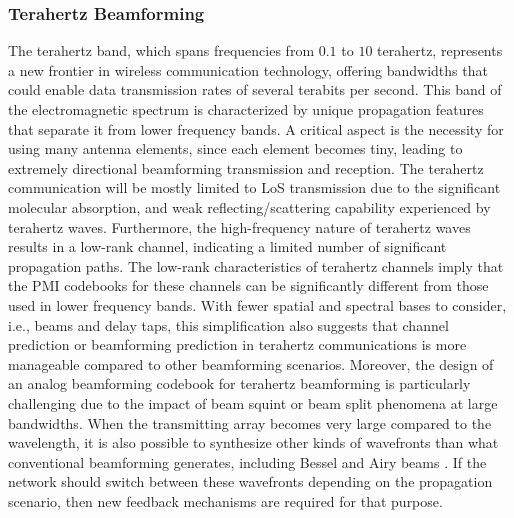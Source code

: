 \documentclass[lettersize,journal]{IEEEtran}
\begin{document}
\subsubsection{Terahertz Beamforming}
The terahertz band, which spans frequencies from $0.1$ to $10$ terahertz, represents a new frontier in wireless communication technology, offering bandwidths that could enable data transmission rates of several terabits per second\cite{thz1,thz2,thz3}. This band of the electromagnetic spectrum is characterized by unique propagation features that separate it from lower frequency bands. A critical aspect is the necessity for using many antenna elements, since each element becomes tiny, leading to extremely directional beamforming transmission and reception.
The terahertz communication will be mostly limited to LoS transmission due to the significant molecular absorption, and weak reflecting/scattering capability experienced by terahertz waves\cite{ningmimo}. Furthermore, the high-frequency nature of terahertz waves results in a low-rank channel, indicating a limited number of significant propagation paths. The low-rank characteristics of terahertz channels imply that the PMI codebooks for these channels can be significantly different from those used in lower frequency bands. With fewer spatial and spectral bases to consider, i.e., beams and delay taps, this simplification also suggests that channel prediction or beamforming prediction in terahertz communications is more manageable compared to other beamforming scenarios. Moreover, the design of an analog beamforming codebook for terahertz beamforming is particularly challenging due to the impact of beam squint or beam split phenomena at large bandwidths\cite{ningcodebookwide,ningmaxmin,ningsplit}. When the transmitting array becomes very large compared to the wavelength, it is also possible to synthesize other kinds of wavefronts than what conventional beamforming generates, including Bessel and Airy beams \cite{Petrov2024}. If the network should switch between these wavefronts depending on the propagation scenario, then new feedback mechanisms are required for that purpose.
\end{document}
